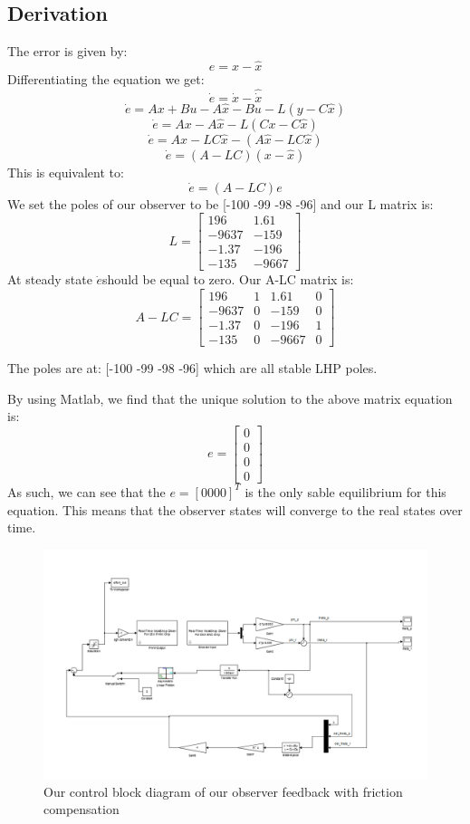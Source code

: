 \subsection{Derivation}
The error is given by:
$$e=x-\hat{x}$$
Differentiating the equation we get:
$$\dot e=\dot x- \hat{\dot x}$$
$$\dot e=Ax+Bu-A\hat{x}-Bu-L(y-C\hat{x})$$
$$\dot e=Ax-A\hat{x}-L(Cx-C\hat{x})$$
$$\dot e=Ax-LC\hat{x}-(A\hat{x}-LC\hat{x})$$
$$\dot e=(A-LC)(x-\hat{x})$$
This is equivalent to:
$$\dot e=(A-LC)e$$
We set the poles of our observer to be [-100 -99 -98 -96] and our L matrix is:
$$
L = 
\begin{bmatrix}
196 & 1.61\\
-9637 & -159\\
-1.37 & -196\\
-135 & -9667
\end{bmatrix}
$$
At steady state $\dot e$should be equal to zero. Our A-LC matrix is:
$$
A-LC = 
\begin{bmatrix}
196 & 1 & 1.61 & 0\\
-9637 & 0 & -159 & 0\\
-1.37 & 0 & -196 & 1\\
-135 & 0 & -9667 & 0
\end{bmatrix}
$$

The poles are at: [-100 -99 -98 -96] which are all stable LHP poles.

By using Matlab, we find that the unique solution to the above matrix equation is:
$$e=
\begin{bmatrix}
0\\
0\\
0\\
0
\end{bmatrix}
$$
As such, we can see that the $e = [0 0 0 0]^T$ is the only sable equilibrium for this equation. This means that the observer states will converge to the real states over time.

\begin{figure}
  \caption{Our control block diagram of our observer feedback with friction compensation}
  \centering
    \includegraphics[scale = 0.4]{observe.PNG}
\end{figure}

